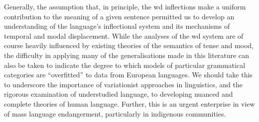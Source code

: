 \documentclass[11pt,dvipsnames]{report}
\begin{document}
Generally, the assumption that, in principle, the \acrshort{wd} inflections make a uniform contribution to the meaning of a given sentence permitted us to develop an understanding of the language's inflectional system and its mechanisms of temporal and modal displacement. While the analyses of the \acrshort{wd} system are of course heavily influenced by existing theories of the semantics of tense and mood, the difficulty in applying many of the generalisations made in this literature can also be taken to indicate the degree to which models of particular grammatical categories are ``overfitted'' to data from European languages. We should take this to underscore the importance of variationist approaches  in linguistics, and the rigorous examination of understudied language, to developing nuanced and complete theories of human language. Further, this is an urgent enterprise in view of mass language endangerment, particularly in indigenous communities.





%




%
\end{document}
